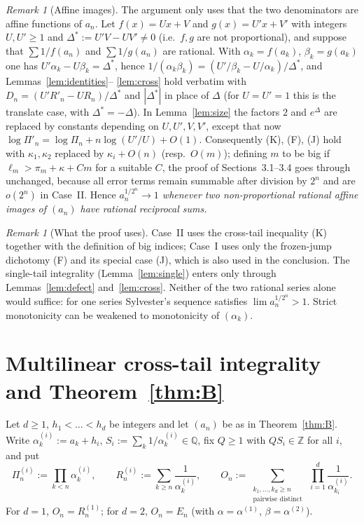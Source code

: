 \documentclass[11pt]{amsart}
\theoremstyle{definition}
\theoremstyle{remark}
\newtheorem{remark}[lemma]{Remark}
\newcommand{\Z}{\mathbb{Z}}
\newcommand{\Q}{\mathbb{Q}}
\begin{document}
\begin{remark}[Affine images]\label{rem:affine}
The argument only uses that the two denominators are affine functions of $a_n$. Let
$f(x)=Ux+V$ and $g(x)=U'x+V'$ with integers $U,U'\ge1$ and $\Delta^*:=U'V-UV'\neq0$
(i.e.\ $f,g$ are not proportional), and suppose that $\sum1/f(a_n)$ and
$\sum1/g(a_n)$ are rational. With $\alpha_k=f(a_k)$, $\beta_k=g(a_k)$ one has
$U'\alpha_k-U\beta_k=\Delta^*$, hence
$1/(\alpha_k\beta_k)=(U'/\beta_k-U/\alpha_k)/\Delta^*$, and Lemmas~\ref{lem:identities}--%
\ref{lem:cross} hold verbatim with $D_n=(U'R'_n-UR_n)/\Delta^*$ and $|\Delta^*|$ in place
of $\Delta$ (for $U=U'=1$ this is the translate case, with $\Delta^*=-\Delta$). In
Lemma~\ref{lem:size} the factors $2$ and $e^{\Delta}$ are replaced by constants
depending on $U,U',V,V'$, except that now $\log\Pi'_n=\log\Pi_n+n\log(U'/U)+O(1)$.
Consequently (K), (F), (J) hold with $\kappa_1,\kappa_2$ replaced by $\kappa_i+O(n)$
(resp.\ $O(m)$); defining $m$ to be big if $\ell_m>\pi_m+\kappa+Cm$ for a suitable $C$,
the proof of Sections~3.1--3.4 goes through unchanged, because all error terms remain
summable after division by $2^n$ and are $o(2^n)$ in Case~II. Hence
\emph{$a_n^{1/2^n}\to1$ whenever two non-proportional rational affine images of $(a_n)$
have rational reciprocal sums.}
\end{remark}

\begin{remark}[What the proof uses]\label{rem:uses}
Case~II uses the cross-tail inequality (K) together with the definition of big
indices; Case~I uses only the frozen-jump dichotomy (F) and its special case (J), which
is also used in the conclusion. The single-tail integrality (Lemma~\ref{lem:single})
enters only through Lemmas~\ref{lem:defect} and~\ref{lem:cross}. Neither of the two
rational series alone would suffice: for one series Sylvester's sequence satisfies
$\lim a_n^{1/2^n}>1$. Strict monotonicity can be weakened to monotonicity of $(\alpha_k)$.
\end{remark}

\section{Multilinear cross-tail integrality and Theorem~\ref{thm:B}}\label{sec:B}

Let $d\ge1$, $h_1<\dots<h_d$ be integers and let $(a_n)$ be as in Theorem~\ref{thm:B}.
Write $\alpha^{(i)}_k:=a_k+h_i$, $S_i:=\sum_k1/\alpha^{(i)}_k\in\Q$, fix $Q\ge1$ with
$QS_i\in\Z$ for all $i$, and put
\[
\Pi^{(i)}_n:=\prod_{k<n}\alpha^{(i)}_k,\qquad R^{(i)}_n:=\sum_{k\ge n}\frac1{\alpha^{(i)}_k},
\qquad
O_n:=\sum_{\substack{k_1,\dots,k_d\ge n\\ \text{pairwise distinct}}}\ \prod_{i=1}^d\frac1{\alpha^{(i)}_{k_i}} .
\]
For $d=1$, $O_n=R^{(1)}_n$; for $d=2$, $O_n=E_n$ (with $\alpha=\alpha^{(1)}$,
$\beta=\alpha^{(2)}$).
\end{document}
